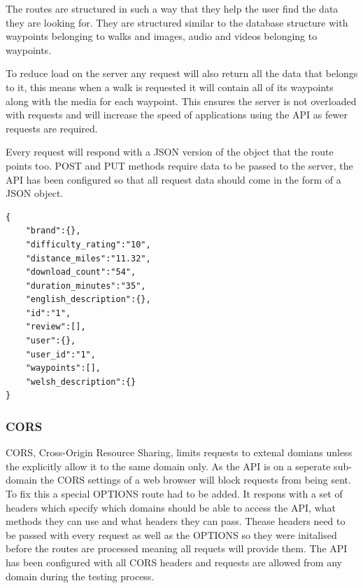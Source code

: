 \documentclass[11pt,a4paper]{article}
\begin{document}
The routes are structured in such a way that they help the user find the data they are looking for. They are structured similar to the database structure with waypoints belonging to walks and images, audio and videos belonging to waypoints. 

To reduce load on the server any request will also return all the data that belongs to it, this means when a walk is requested it will contain all of its waypoints along with the media for each waypoint. This ensures the server is not overloaded with requests and will increase the speed of applications using the API as fewer requests are required.

Every request will respond with a JSON version of the object that the route points too. POST and PUT methods require data to be passed to the server, the API has been configured so that all request data should come in the form of a JSON object. 


\begin{lstlisting}[captionpos=b, caption=JSON Return data from /walks/1, label=lst:model, frame=single]
{
	"brand":{},
	"difficulty_rating":"10",
	"distance_miles":"11.32",
	"download_count":"54",
	"duration_minutes":"35",
	"english_description":{},
	"id":"1",
	"review":[],
	"user":{},
	"user_id":"1",
	"waypoints":[],
	"welsh_description":{}
}
\end{lstlisting}

\subsubsection{CORS}
CORS, Cross-Origin Resource Sharing, limits requests to extenal domians unless the explicitly allow it to the same domain only. As the API is on a seperate sub-domain the CORS settings of a web browser will block requests from being sent. To fix this a special OPTIONS route had to be added. It respons with a set of headers which specify which domains should be able to access the API, what methods they can use and what headers they can pass. Thease headers need to be passed with every request as well as the OPTIONS so they were initalised before the routes are processed meaning all requets will provide them. The API has been configured with all CORS headers and requests are allowed from any domain during the testing process. 
\end{document}
